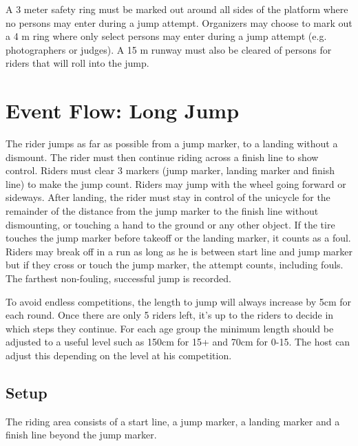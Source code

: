A 3 meter safety ring must be marked out around all sides of the platform where no persons may enter during a jump attempt.
Organizers may choose to mark out a 4 m ring where only select persons may enter during a jump attempt (e.g. photographers or judges).
A 15 m runway must also be cleared of persons for riders that will roll into the jump.

\section{Event Flow: Long Jump}
The rider jumps as far as possible from a jump marker, to a landing without a dismount.
The rider must then continue riding across a finish line to show control.
Riders must clear 3 markers (jump marker, landing marker and finish line) to make the jump count.
Riders may jump with the wheel going forward or sideways.
After landing, the rider must stay in control of the unicycle for the remainder of the distance from the jump marker to the finish line without dismounting, or touching a hand to the ground or any other object.
If the tire touches the jump marker before takeoff or the landing marker, it counts as a foul.
Riders may break off in a run as long as he is between start line and jump marker but if they cross or touch the jump marker, the attempt counts, including fouls.
The farthest non-fouling, successful jump is recorded.

To avoid endless competitions, the length to jump will always increase by 5cm for each round.
Once there are only 5 riders left, it's up to the riders to decide in which steps they continue.
For each age group the minimum length should be adjusted to a useful level such as 150cm for 15+ and 70cm for 0-15.
The host can adjust this depending on the level at his competition.

\subsection{Setup}
The riding area consists of a start line, a jump marker, a landing marker and a finish line beyond the jump marker.

